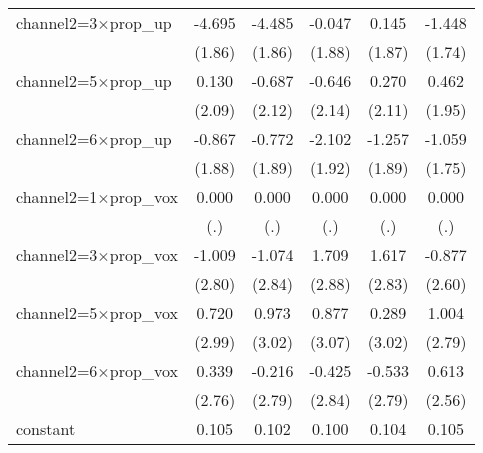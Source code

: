 \begin{table}[htbp]
\begin{tabular}{l*{5}{c}}
channel2=3$\times$prop\_up&      -4.695\sym{*}  &      -4.485\sym{*}  &      -0.047         &       0.145         &      -1.448         \\
                    &      (1.86)         &      (1.86)         &      (1.88)         &      (1.87)         &      (1.74)         \\
channel2=5$\times$prop\_up&       0.130         &      -0.687         &      -0.646         &       0.270         &       0.462         \\
                    &      (2.09)         &      (2.12)         &      (2.14)         &      (2.11)         &      (1.95)         \\
channel2=6$\times$prop\_up&      -0.867         &      -0.772         &      -2.102         &      -1.257         &      -1.059         \\
                    &      (1.88)         &      (1.89)         &      (1.92)         &      (1.89)         &      (1.75)         \\
channel2=1$\times$prop\_vox&       0.000         &       0.000         &       0.000         &       0.000         &       0.000         \\
                    &         (.)         &         (.)         &         (.)         &         (.)         &         (.)         \\
channel2=3$\times$prop\_vox&      -1.009         &      -1.074         &       1.709         &       1.617         &      -0.877         \\
                    &      (2.80)         &      (2.84)         &      (2.88)         &      (2.83)         &      (2.60)         \\
channel2=5$\times$prop\_vox&       0.720         &       0.973         &       0.877         &       0.289         &       1.004         \\
                    &      (2.99)         &      (3.02)         &      (3.07)         &      (3.02)         &      (2.79)         \\
channel2=6$\times$prop\_vox&       0.339         &      -0.216         &      -0.425         &      -0.533         &       0.613         \\
                    &      (2.76)         &      (2.79)         &      (2.84)         &      (2.79)         &      (2.56)         \\
constant            &       0.105\sym{***}&       0.102\sym{***}&       0.100\sym{***}&       0.104\sym{***}&       0.105\sym{***}\\

\end{tabular}
\end{table}
